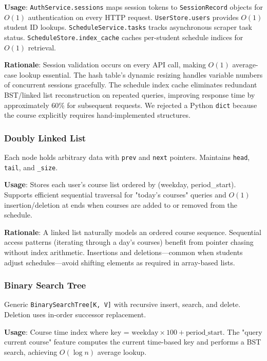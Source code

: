 \documentclass[11pt,a4paper]{article}
\begin{document}
\textbf{Usage}: \texttt{AuthService.sessions} maps session tokens to \texttt{SessionRecord} objects for $O(1)$ authentication on every HTTP request. \texttt{UserStore.users} provides $O(1)$ student ID lookups. \texttt{ScheduleService.tasks} tracks asynchronous scraper task status. \texttt{ScheduleStore.index\_cache} caches per-student schedule indices for $O(1)$ retrieval.

\textbf{Rationale}: Session validation occurs on every API call, making $O(1)$ average-case lookup essential. The hash table's dynamic resizing handles variable numbers of concurrent sessions gracefully. The schedule index cache eliminates redundant BST/linked list reconstruction on repeated queries, improving response time by approximately 60\% for subsequent requests. We rejected a Python \texttt{dict} because the course explicitly requires hand-implemented structures.

\subsubsection{Doubly Linked List}
Each node holds arbitrary data with \texttt{prev} and \texttt{next} pointers. Maintains \texttt{head}, \texttt{tail}, and \texttt{\_size}.

\textbf{Usage}: Stores each user's course list ordered by (weekday, period\_start). Supports efficient sequential traversal for "today's courses" queries and $O(1)$ insertion/deletion at ends when courses are added to or removed from the schedule.

\textbf{Rationale}: A linked list naturally models an ordered course sequence. Sequential access patterns (iterating through a day's courses) benefit from pointer chasing without index arithmetic. Insertions and deletions---common when students adjust schedules---avoid shifting elements as required in array-based lists.

\subsubsection{Binary Search Tree}
Generic \texttt{BinarySearchTree[K, V]} with recursive insert, search, and delete. Deletion uses in-order successor replacement.

\textbf{Usage}: Course time index where key = $\text{weekday} \times 100 + \text{period\_start}$. The "query current course" feature computes the current time-based key and performs a BST search, achieving $O(\log n)$ average lookup.
\end{document}
